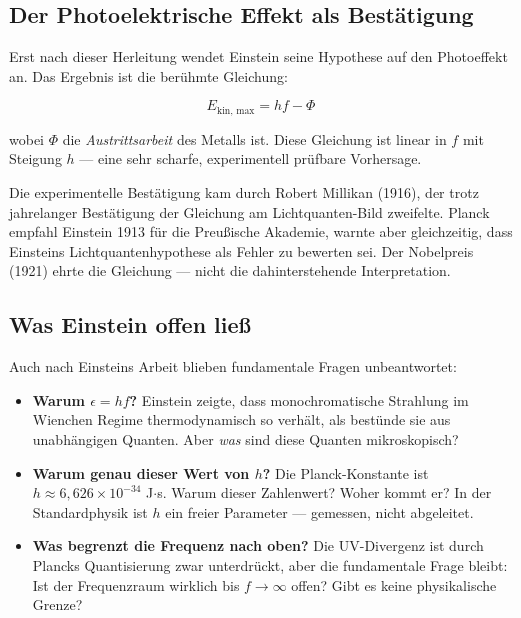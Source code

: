 \subsection{Der Photoelektrische Effekt als Bestätigung}

Erst nach dieser Herleitung wendet Einstein seine Hypothese auf den Photoeffekt an. 
Das Ergebnis ist die berühmte Gleichung:

\begin{equation}
    E_{\text{kin, max}} = hf - \Phi
    \label{eq:photoelectric}
\end{equation}

wobei $\Phi$ die \emph{Austrittsarbeit} des Metalls ist. Diese Gleichung ist linear 
in $f$ mit Steigung $h$ — eine sehr scharfe, experimentell prüfbare Vorhersage.

Die experimentelle Bestätigung kam durch Robert Millikan (1916), der trotz jahrelanger 
Bestätigung der Gleichung am Lichtquanten-Bild zweifelte. Planck empfahl Einstein 
1913 für die Preußische Akademie, warnte aber gleichzeitig, dass Einsteins 
Lichtquantenhypothese als Fehler zu bewerten sei. Der Nobelpreis (1921) ehrte 
die Gleichung — nicht die dahinterstehende Interpretation.

\subsection{Was Einstein offen ließ}

Auch nach Einsteins Arbeit blieben fundamentale Fragen unbeantwortet:

\begin{itemize}
    \item \textbf{Warum $\epsilon = hf$?} Einstein zeigte, dass monochromatische 
    Strahlung im Wienchen Regime thermodynamisch so verhält, als bestünde sie aus 
    unabhängigen Quanten. Aber \emph{was} sind diese Quanten mikroskopisch?
    
    \item \textbf{Warum genau dieser Wert von $h$?} Die Planck-Konstante ist 
    $h \approx 6{,}626 \times 10^{-34}$ J$\cdot$s. Warum dieser Zahlenwert? 
    Woher kommt er? In der Standardphysik ist $h$ ein freier Parameter — gemessen, 
    nicht abgeleitet.
    
    \item \textbf{Was begrenzt die Frequenz nach oben?} Die UV-Divergenz ist durch 
    Plancks Quantisierung zwar unterdrückt, aber die fundamentale Frage bleibt: 
    Ist der Frequenzraum wirklich bis $f \to \infty$ offen? Gibt es keine physikalische 
    Grenze?
\end{itemize}

